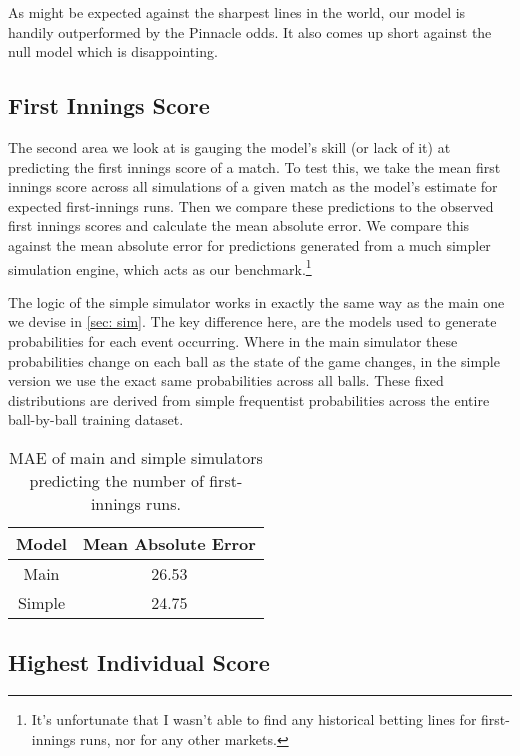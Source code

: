 As might be expected against the sharpest lines in the world, our model is handily outperformed by the Pinnacle odds. It also comes up short against the null model which is disappointing.

\subsection{First Innings Score}
\label{subsec: fis}

The second area we look at is gauging the model's skill (or lack of it) at predicting the first innings score of a match. To test this, we take the mean first innings score across all simulations of a given match as the model's estimate for expected first-innings runs. Then we compare these predictions to the observed first innings scores and calculate the mean absolute error. We compare this against the mean absolute error for predictions generated from a much simpler simulation engine, which acts as our benchmark.\footnote{It's unfortunate that I wasn't able to find any historical betting lines for first-innings runs, nor for any other markets.}

The logic of the simple simulator works in exactly the same way as the main one we devise in \cref{sec: sim}. The key difference here, are the models used to generate probabilities for each event occurring. Where in the main simulator these probabilities change on each ball as the state of the game changes, in the simple version we use the exact same probabilities across all balls. These fixed distributions are derived from simple frequentist probabilities across the entire ball-by-ball training dataset.

\begin{table}[ht]
\vspace{0.5em}
\centering
\begin{tabular} {c c} \toprule
    {Model} & {Mean Absolute Error} \\ \midrule
     Main & 26.53 \\
     Simple & 24.75 \\ \bottomrule
\end{tabular}
\caption{MAE of main and simple simulators predicting the number of first-innings runs.}
\label{table: fis}
\end{table}

\subsection{Highest Individual Score}

